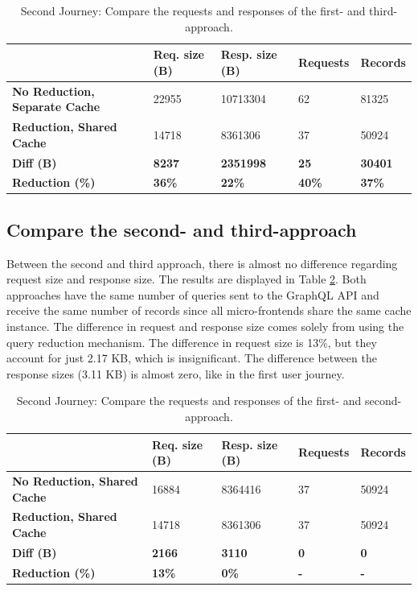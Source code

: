 \ifshowTables
\begin{table}[H]
  \begin{tabular}{|l|l|l|l|l|}
  \hline
  & \textbf{Req. size (B)} & \textbf{Resp. size (B)} & \textbf{Requests} & \textbf{Records} \\
  \hline
  \textbf{No Reduction, Separate Cache} & 22955 & 10713304 & 62 & 81325 \\
  \hline
  \textbf{Reduction, Shared Cache} & 14718 & 8361306 & 37 & 50924 \\
  \hline
  \hline
  \textbf{Diff (B)} & \textbf{8237} & \textbf{2351998} & \textbf{25} & \textbf{30401} \\
  \hline
  \textbf{Reduction (\%)} & \textbf{36\%} & \textbf{22\%} & \textbf{40\%} & \textbf{37\%} \\
  \hline
  \end{tabular}
  \caption{Second Journey: Compare the requests and responses of the first- and third-approach.}\label{table:results:size-comparison-second-path-no-cache-no-reduction-cache-reduction}
\end{table}
\fi

\subsection{Compare the second- and third-approach}\label{subsection:results:comparison-second-path-first-third-approach}

Between the second and third approach, there is almost no difference regarding request size and response size. The results are displayed in Table \ref{table:results:size-comparison-second-path-no-cache-no-reduction-cache-no-reduction}. Both approaches have the same number of queries sent to the GraphQL \ac{API} and receive the same number of records since all micro-frontends share the same cache instance. The difference in request and response size comes solely from using the query reduction mechanism. The difference in request size is 13\%, but they account for just 2.17 KB, which is insignificant. The difference between the response sizes (3.11 KB) is almost zero, like in the first user journey.

\ifshowTables
\begin{table}[H]
  \begin{tabular}{|l|l|l|l|l|}
  \hline
  & \textbf{Req. size (B)} & \textbf{Resp. size (B)} & \textbf{Requests} & \textbf{Records} \\
  \hline
  \textbf{No Reduction, Shared Cache} & 16884 & 8364416 & 37 & 50924 \\
  \hline
  \textbf{Reduction, Shared Cache} & 14718 & 8361306 & 37 & 50924 \\
  \hline
  \hline
  \textbf{Diff (B)} & \textbf{2166} & \textbf{3110} & \textbf{0} & \textbf{0} \\
  \hline
  \textbf{Reduction (\%)} & \textbf{13\%} & \textbf{0\%} & \textbf{-} & \textbf{-} \\
  \hline
  \end{tabular}
  \caption{Second Journey: Compare the requests and responses of the first- and second-approach.}\label{table:results:size-comparison-second-path-no-cache-no-reduction-cache-no-reduction}
\end{table}
\fi